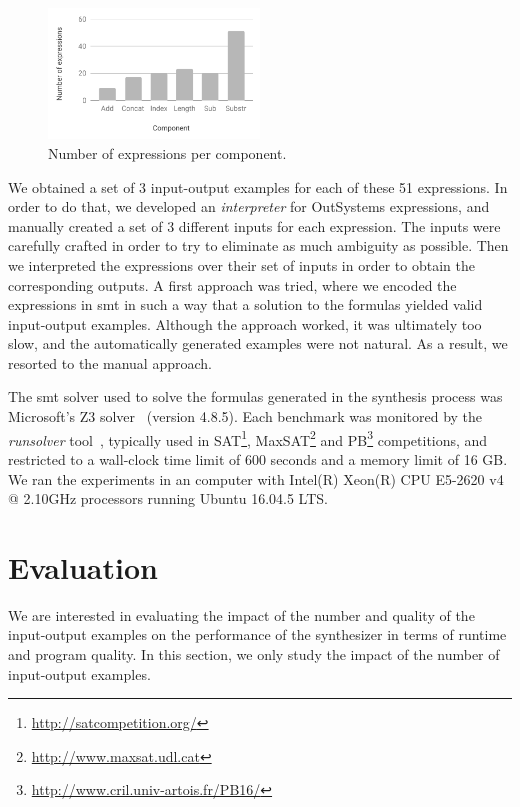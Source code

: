 \begin{figure}
  \centering
  \includegraphics[width=0.5\textwidth]{assets/bar-chart-components-freq-51.pdf}
  \caption{Number of expressions per component.}
  \label{fig:bar-chart-components-freq-51}
\end{figure}

We obtained a set of 3 input-output examples for each of these 51 expressions.
In order to do that, we developed an \textit{interpreter} for OutSystems
expressions, and manually created a set of 3 different inputs for each
expression.
The inputs were carefully crafted in order to try to eliminate as much ambiguity
as possible.
Then we interpreted the expressions over their set of inputs in order to
obtain the corresponding outputs.
A first approach was tried, where we encoded the expressions in \gls{smt} in
such a way that a solution to the formulas yielded valid input-output examples.
Although the approach worked, it was ultimately too slow, and the automatically
generated examples were not natural.
As a result, we resorted to the manual approach.

The \gls{smt} solver used to solve the formulas generated in the synthesis
process was Microsoft's Z3 solver~\cite{DeMoura:2008:ZES} (version 4.8.5).
Each benchmark was monitored by the \textit{runsolver}
tool~\cite{Roussel:2011:JSAT}, typically used in
SAT\footnote{\url{http://satcompetition.org/}},
MaxSAT\footnote{\url{http://www.maxsat.udl.cat}} and
PB\footnote{\url{http://www.cril.univ-artois.fr/PB16/}}
competitions, and restricted to a wall-clock time limit of 600 seconds and a
memory limit of 16 GB.
We ran the experiments in an computer with Intel(R) Xeon(R) CPU E5-2620 v4 @
2.10GHz processors running Ubuntu 16.04.5 LTS.

\section{Evaluation}
\label{sec:results}

We are interested in evaluating the impact of the number and quality of the
input-output examples on the performance of the synthesizer in terms of runtime
and program quality.
In this section, we only study the impact of the number of input-output
examples.

